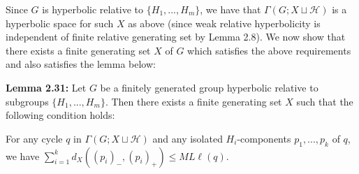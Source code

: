 \documentclass[12pt]{article}
\newcommand{\vs}{\vskip10pt}
\begin{document}
	Since $G$ is hyperbolic relative to $\{H_1,...,H_m\}$, we have that $\Gamma(G; X \sqcup \mathcal{H})$ is a hyperbolic space for such $X$ as above (since weak relative hyperbolicity is independent of finite relative generating set by Lemma 2.8). We now show that there exists a finite generating set $X$ of $G$ which satisfies the above requirements and also satisfies the lemma below: 
	
	\vs 
	
	\textbf{Lemma 2.31: } Let $G$ be a finitely generated group hyperbolic relative to subgroups $\{H_1,...,H_m\}$. Then there exists a finite generating set $X$ such that the following condition holds: 
	
	\vs 
	
	For any cycle $q$ in $\Gamma(G; X \sqcup \mathcal{H})$ and any isolated $H_i$-components $p_1,...,p_k$ of $q$, we have $\sum_{i=1}^k d_X((p_i)_{-}, (p_i)_{+}) \leq ML \ell(q)$. 
	
\end{document}
